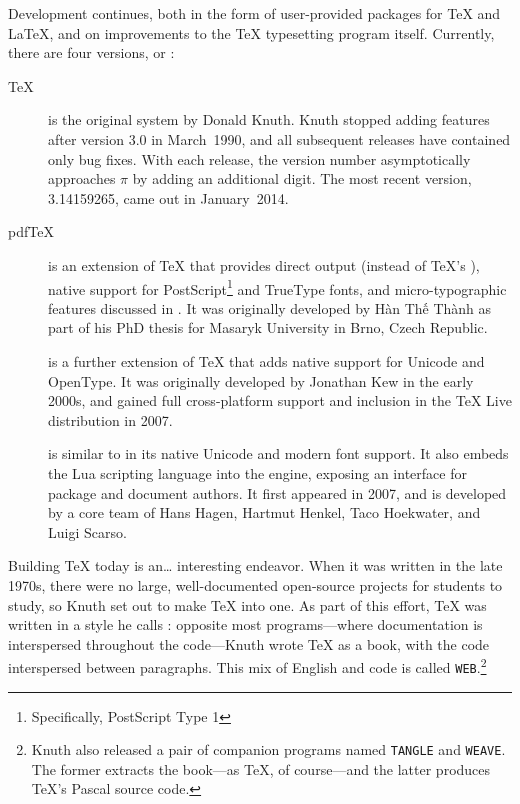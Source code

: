 Development continues,
both in the form of user-provided packages for \TeX{} and \LaTeX{},
and on improvements to the \TeX{} typesetting program itself.
Currently, there are four versions, or :
\begin{description}
\item[\TeX] is the original system by Donald Knuth.
Knuth stopped adding features after version 3.0 in March~1990,
and all subsequent releases have contained only bug fixes.
With each release, the version number asymptotically approaches $\pi$
by adding an additional digit.
The most recent version, 3.14159265, came out in January~2014.

\item[pdf\TeX] is an extension of \TeX{} that provides direct 
    output (instead of \TeX's ),
    native support for PostScript\footnote{%
    Specifically, PostScript Type 1}
    and TrueType fonts,
    and micro-typographic features discussed in .
    It was originally developed by
    Hàn Thế Thành
    as part of his PhD thesis
    for Masaryk University in Brno, Czech Republic.\punckern{}

\item[\XeTeX] is a further extension of \TeX{} that adds native support for
    Unicode and OpenType.
    It was originally developed by Jonathan Kew in the early 2000s,
    and gained full cross-platform support and inclusion in the \TeX{} Live
    distribution in 2007.\punckern{}

\item[\LuaTeX] is similar to \XeTeX{} in its native Unicode and modern font support.
    It also embeds the Lua scripting language into the engine,
    exposing an interface for package and document authors.
    It first appeared in 2007, and is developed by a core team of
    Hans Hagen, Hartmut Henkel, Taco Hoekwater,
    and Luigi Scarso.\punckern{}
\end{description}

Building \TeX{} today is an\ldots{} interesting endeavor.
When it was written in the late 1970s,
there were no large, well-documented open-source projects for students to study,
so Knuth set out to make \TeX{} into one.
As part of this effort, \TeX{} was written in a style he calls
: opposite most programs---where
documentation is interspersed throughout the code---Knuth wrote \TeX{} as a book,
with the code interspersed between paragraphs.
This mix of English and code is called \texttt{WEB}.\punckern\footnote{Knuth
also released a pair of companion programs named
\texttt{TANGLE} and \texttt{WEAVE}.
The former extracts the book---as \TeX, of course---and the latter
produces \TeX's Pascal source code.}

